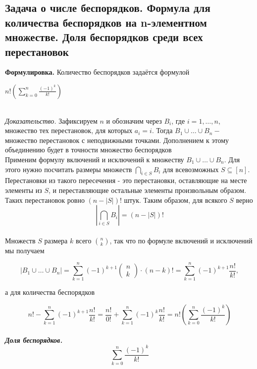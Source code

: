 \documentclass[a4paper]{article}
\begin{document}
\subsection{Задача о числе беспорядков. Формула для количества беспорядков на n-элементном множестве. Доля беспорядков среди всех перестановок}
\textbf{Формулировка.} Количество беспорядков задаётся формулой\\[2mm]
\centerline{$n!\left(\sum\limits_{k=0}^{n} \frac{(-1)^{k}}{k !}\right)$}\\[2mm]
\textit{Доказательство.} Зафиксируем $n$ и обозначим через $B_{i}$, где $i=1, \ldots, n$, множество тех перестановок, для которых $a_{i}=i$. Тогда $B_{1} \cup \ldots \cup B_{n}-$ множество перестановок с неподвижными точками. Дополнением к этому объединению будет в точности множество беспорядков\\[2mm]
 Применим формулу включений и исключений к множеству $B_{1} \cup \ldots \cup B_{n}$. Для этого нужно посчитать размеры множеств $\bigcap\limits_{i \in S} B_{i}$ для всевозможных $S \subseteq[n]$. Перестановки из такого пересечения - это перестановки, оставляющие на месте элементы из $S$, и переставляющие остальные элементы произвольным образом. Таких перестановок ровно $(n-|S|)$! штук. Таким образом, для всякого $S$ верно\\[2mm]
$$\left|\bigcap_{i \in S} B_{i}\right|=(n-|S|)!$$\\[2mm]
Множеств $S$ размера $k$ всего $\binom{n}{k}$, так что по формуле включений и исключений мы получаем

$$
\left|B_{1} \cup \ldots \cup B_{n}\right|=\sum_{k=1}^{n}(-1)^{k+1}\left(\begin{array}{l}
n \\
k
\end{array}\right) \cdot(n-k) !=\sum_{k=1}^{n}(-1)^{k+1} \frac{n !}{k !},
$$

а для количества беспорядков

$$
n !-\sum_{k=1}^{n}(-1)^{k+1} \frac{n !}{k !}=\frac{n !}{0 !}+\sum_{k=1}^{n}(-1)^{k} \frac{n !}{k !}=n !\left(\sum_{k=0}^{n} \frac{(-1)^{k}}{k !}\right)
$$\\[2mm]
\textit{\textbf{Доля беспорядков.}} $$
\sum_{k=0}^{n} \frac{(-1)^{k}}{k !}
$$
\end{document}
